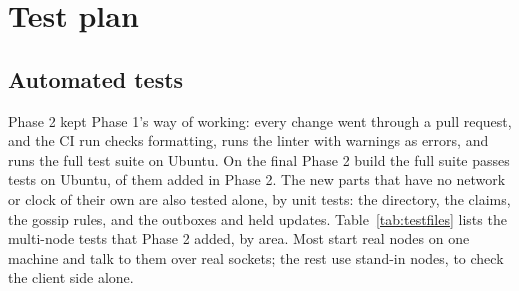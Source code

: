 \section{Test plan}
\label{sec:testing}

\subsection{Automated tests}
\label{sec:tests}

Phase 2 kept Phase 1's way of working: every change went through a pull request, and the CI run checks formatting, runs the linter with warnings as errors, and runs the full test suite on Ubuntu. On the final Phase 2 build the full suite passes \tbd{} tests on Ubuntu, \tbd{} of them added in Phase 2. The new parts that have no network or clock of their own are also tested alone, by unit tests: the directory, the claims, the gossip rules, and the outboxes and held updates. Table~\ref{tab:testfiles} lists the multi-node tests that Phase 2 added, by area. Most start real nodes on one machine and talk to them over real sockets; the rest use stand-in nodes, to check the client side alone.

